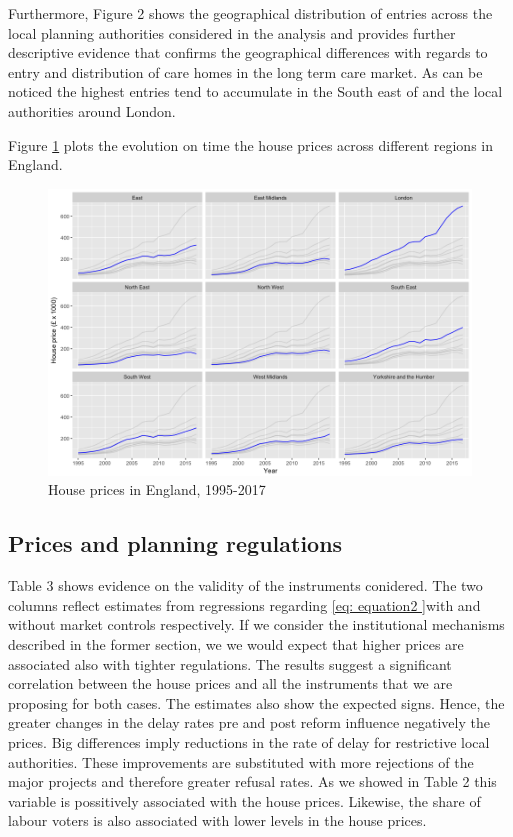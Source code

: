 \documentclass[12pt,letterpaper]{article}
\begin{document}
  Furthermore, Figure 2 shows the geographical distribution of entries across 
  the local planning authorities considered in the analysis and provides
   further descriptive evidence that confirms the geographical differences with regards to entry and distribution
    of care homes in the long term care market. As can be noticed the highest entries tend to accumulate in the
     South east of and the local authorities around London. 

     Figure \ref{fig: house_prices} 
     plots the evolution on time the house prices across different regions in 
     England. 
     
     
\begin{figure}[h!]
\includegraphics[width=1\textwidth]{house_prices_england.png}
\caption{House prices in England, 1995-2017}
\label{fig: house_prices}
\end{figure}
\label{sec:dependent variable}

\subsection{Prices and planning regulations}
Table 3 shows evidence on the validity of the instruments conidered. 
The two columns reflect estimates from regressions regarding \ref{eq: equation2 }with and without market 
controls respectively. If we consider the institutional mechanisms described in the former section, 
we we would expect that higher prices are associated also with tighter regulations. The results suggest 
a significant correlation between the house prices and all the instruments that we are proposing for both 
cases. The estimates also show the expected signs. Hence, the greater changes in the delay rates pre and
 post reform influence negatively the prices. Big differences imply reductions in the rate of delay for restrictive
  local authorities. These improvements are substituted with more rejections of the major projects and therefore 
  greater refusal rates. As we showed in Table 2 this variable is possitively associated with the house prices. 
  Likewise, the share of labour voters is also associated with lower levels in the house prices.
\end{document}
